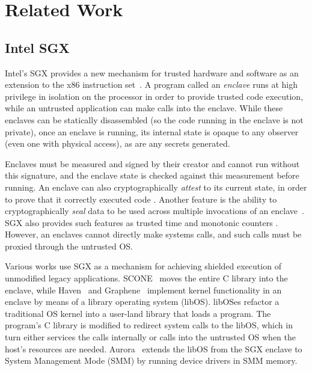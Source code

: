 \section{Related Work}
\label{sec:related}

\subsection{Intel SGX}
\label{sec:related-sgx}

Intel's SGX provides a new mechanism for trusted hardware and software as an
extension to the x86 instruction set~\cite{sgx, mckeen2013innovative}.  
%
A program called an \textit{enclave} runs at high privilege in isolation on the
processor in order to provide trusted code execution, while an untrusted
application can make calls into the enclave.
%
While these enclaves can be statically disassembled (so the code running in the
enclave is not private), once an enclave is running, its internal state
is opaque to any observer (even one with physical access), as are any secrets
generated.  


Enclaves must be measured and signed by their creator and cannot run without
this signature, and the enclave state is checked against this measurement
before running.  
%
An enclave can also cryptographically \textit{attest} to its current state, in
order to prove that it correctly executed code \cite{sgx_provisioning,
anati2013innovative}.  
%
Another feature is the ability to cryptographically \textit{seal} data to be
used across multiple invocations of an enclave~\cite{anati2013innovative,
sgx_sealing}.  
%
SGX also provides such features as trusted time and monotonic counters
\cite{sgx-linux-sdk,sgx-trusted-time}.  
%
However, an enclaves cannot directly make systems calls, and such calls must be
proxied through the untrusted OS\@.


%
Various works use SGX as a mechanism for achieving shielded execution of
unmodified legacy applications.
%
SCONE~\cite{scone} moves the entire C library into the enclave, while
Haven~\cite{haven} and Graphene~\cite{graphene} 
implement kernel functionality in an enclave by means of a library operating
system (libOS).
%
libOSes refactor a traditional OS kernel into a user-land library that loads a
program.
%
The program's C library is modified to redirect system calls to the libOS, which
in turn either services the calls internally or calls into the untrusted OS
when the host's resources are needed.
%
Aurora~\cite{liang2018aurora} extends the libOS from the SGX enclave to System
Management Mode (SMM) by running device drivers in SMM memory.


